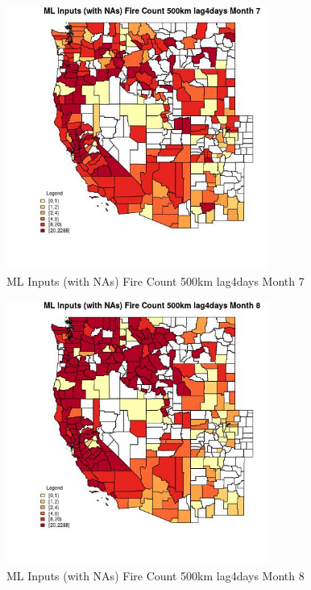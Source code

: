 \begin{figure} 
\centering  
\includegraphics[width=0.77\textwidth]{Code_Outputs/Report_ML_input_PM25_Step4_part_e_de_duplicated_aves_compiled_2019-05-20wNAs_CountyFire_Count_500km_lag4daysmedianMonth7.jpg} 
\caption{\label{fig:Report_ML_input_PM25_Step4_part_e_de_duplicated_aves_compiled_2019-05-20wNAsCountyFire_Count_500km_lag4daysmedianMonth7}ML Inputs (with NAs) Fire Count 500km lag4days Month 7} 
\end{figure} 
 

\begin{figure} 
\centering  
\includegraphics[width=0.77\textwidth]{Code_Outputs/Report_ML_input_PM25_Step4_part_e_de_duplicated_aves_compiled_2019-05-20wNAs_CountyFire_Count_500km_lag4daysmedianMonth8.jpg} 
\caption{\label{fig:Report_ML_input_PM25_Step4_part_e_de_duplicated_aves_compiled_2019-05-20wNAsCountyFire_Count_500km_lag4daysmedianMonth8}ML Inputs (with NAs) Fire Count 500km lag4days Month 8} 
\end{figure} 
 

